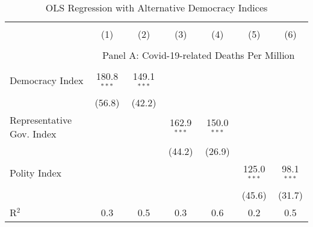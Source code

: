 
\begin{table}[!htbp] \centering 
  \caption{OLS Regression with Alternative Democracy Indices} 
  \label{ols-indices} 
  \begin{threeparttable}
\begin{tabular}{@{\extracolsep{0pt}}lcccccc} 
\\[-1.8ex]\hline 
\hline 
\\[-1.8ex] & (1) & (2) & (3) & (4) & (5) & (6)\\


  \hline \\[-1.8ex]  & \multicolumn{6}{c}{Panel A: Covid-19-related Deaths Per Million} \\
 \cline{2-7} \\[-1.8ex]
 Democracy Index & 180.8$^{***}$ & 149.1$^{***}$ &  &  &  & \\ 
  & (56.8) & (42.2) &  &  &  &  \\ 
  Representative Gov. Index &  &  & 162.9$^{***}$ & 150.0$^{***}$ &  &  \\ 
  &  &  & (44.2) & (26.9) &  &  \\ 
  Polity Index &  &  &  &  & 125.0$^{***}$ & 98.1$^{***}$ \\ 
  &  &  &  &  & (45.6) & (31.7) \\ 
  R$^{2}$ & 0.3 & 0.5 & 0.3 & 0.6 & 0.2 & 0.5\\
 
  
  

\end{tabular}
\end{threeparttable}
\end{table}
